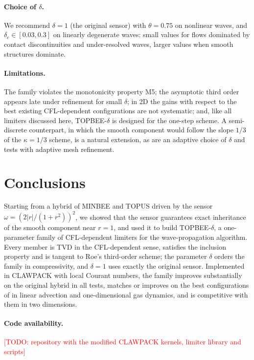 \documentclass[11pt]{article}
\newcommand{\scheme}{TOPBEE-$\delta$}
\newcommand{\todo}[1]{\textcolor{red}{[TODO: #1]}}
\theoremstyle{plain}
\theoremstyle{definition}
\begin{document}
\paragraph{Choice of $\delta$.} We recommend $\delta=1$ (the original sensor) with $\theta=0.75$ on nonlinear waves, and $\delta_c\in[0.03,0.3]$ on linearly degenerate waves: small values for flows dominated by contact discontinuities and under-resolved waves, larger values when smooth structures dominate.

\paragraph{Limitations.} The family violates the monotonicity property M5; the asymptotic third order appears late under refinement for small $\delta$; in 2D the gains with respect to the best existing CFL-dependent configurations are not systematic; and, like all limiters discussed here, \scheme{} is designed for the one-step scheme. A semi-discrete counterpart, in which the smooth component would follow the slope $1/3$ of the $\kappa=1/3$ scheme, is a natural extension, as are an adaptive choice of $\delta$ and tests with adaptive mesh refinement.

\section{Conclusions}\label{sec:conclusions}
Starting from a hybrid of MINBEE and TOPUS driven by the sensor $\omega=(2|r|/(1+r^2))^2$, we showed that the sensor guarantees exact inheritance of the smooth component near $r=1$, and used it to build \scheme, a one-parameter family of CFL-dependent limiters for the wave-propagation algorithm. Every member is TVD in the CFL-dependent sense, satisfies the inclusion property and is tangent to Roe's third-order scheme; the parameter $\delta$ orders the family in compressivity, and $\delta=1$ uses exactly the original sensor. Implemented in CLAWPACK with local Courant numbers, the family improves substantially on the original hybrid in all tests, matches or improves on the best configurations of \cite{Kemm2011} in linear advection and one-dimensional gas dynamics, and is competitive with them in two dimensions.

\paragraph{Code availability.} \todo{repository with the modified CLAWPACK kernels, limiter library and scripts}
\end{document}
